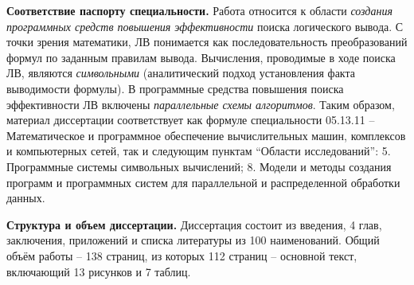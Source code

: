 \documentclass[a4paper]{report}
\begin{document}



\textbf{Соответствие паспорту специальности.}
Работа относится к области \emph{создания программных средств повышения эффективности} поиска логического вывода. С точки зрения математики, ЛВ понимается как последовательность преобразований формул по заданным правилам вывода. Вычисления, проводимые в ходе поиска ЛВ, являются \emph{символьными} (аналитический подход установления факта выводимости формулы). В программные средства повышения поиска эффективности ЛВ включены \emph{параллельные схемы алгоритмов}. Таким образом, материал диссертации соответствует как формуле специальности 05.13.11 -- Математическое и программное обеспечение вычислительных машин, комплексов и компьютерных сетей, так и следующим пунктам ``Области исследований'': 5. Программные системы символьных вычислений; 8. Модели и методы создания программ и программных систем для параллельной и распределенной обработки данных.

\textbf{Структура и объем диссертации.} Диссертация состоит из введения, 4 глав, заключения, приложений и списка литературы из 100 наименований. Общий объём работы -- 138 страниц, из которых 112 страниц -- основной текст, включающий 13 рисунков и 7 таблиц.
\end{document}
